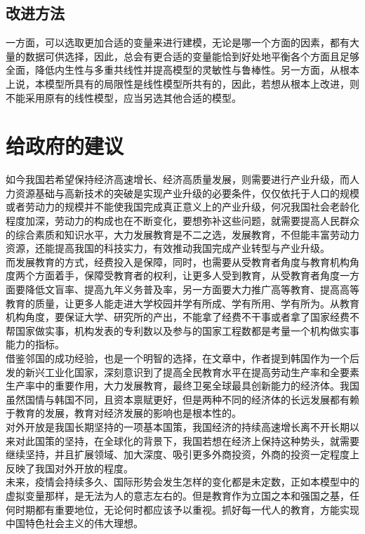 \documentclass[UTF8]{article}
\begin{document}
	\subsection{改进方法}
	一方面，可以选取更加合适的变量来进行建模，无论是哪一个方面的因素，都有大量的数据可供选择，因此，总会有更合适的变量能恰到好处地平衡各个方面且足够全面，降低内生性与多重共线性并提高模型的灵敏性与鲁棒性。另一方面，从根本上说，本模型所具有的局限性是线性模型所共有的，因此，若想从根本上改进，则不能采用原有的线性模型，应当另选其他合适的模型。
	\section{给政府的建议}
	如今我国若希望保持经济高速增长、经济高质量发展，则需要进行产业升级，而人力资源基础与高新技术的突破是实现产业升级的必要条件，仅仅依托于人口的规模或者劳动力的规模并不能使我国完成真正意义上的产业升级，何况我国社会老龄化程度加深\cite{llh}，劳动力的构成也在不断变化，要想弥补这些问题，就需要提高人民群众的综合素质和知识水平，大力发展教育是不二之选，发展教育，不但能丰富劳动力资源，还能提高我国的科技实力，有效推动我国完成产业转型与产业升级。
	\\\indent 
	而发展教育的方式，经费投入是保障，同时，也需要从受教育者角度与教育机构角度两个方面着手，保障受教育者的权利，让更多人受到教育，从受教育者角度一方面要降低文盲率、提高九年义务普及率，另一方面要大力推广高等教育、提高高等教育的质量，让更多人能走进大学校园并学有所成、学有所用、学有所为。从教育机构角度，要保证大学、研究所的产出，不能拿了经费不干事或者拿了国家经费不帮国家做实事，机构发表的专利数以及参与的国家工程数都是考量一个机构做实事能力的指标。
	\\\indent
	借鉴邻国的成功经验，也是一个明智的选择，在文章\cite{ywf2017eduandeco}中，作者提到韩国作为一个后发的新兴工业化国家，深刻意识到了提高全民教育水平在提高劳动生产率和全要素生产率中的重要作用，大力发展教育，最终卫冕全球最具创新能力的经济体。我国虽然国情与韩国不同，且资本禀赋更好，但是两种不同的经济体的长远发展都有赖于教育的发展，教育对经济发展的影响也是根本性的。
	\\\indent 
	对外开放是我国长期坚持的一项基本国策，我国经济的持续高速增长离不开长期以来对此国策的坚持，在全球化的背景下，我国若想在经济上保持这种势头，就需要继续坚持，并且扩展领域、加大深度、吸引更多外商投资，外商的投资一定程度上反映了我国对外开放的程度。
	\\\indent
	未来，疫情会持续多久、国际形势会发生怎样的变化都是未定数，正如本模型中的虚拟变量那样，是无法为人的意志左右的。但是教育作为立国之本和强国之基，任何时期都有重要地位，无论何时都应该予以重视。抓好每一代人的教育，方能实现中国特色社会主义的伟大理想。
	
	
\end{document}

